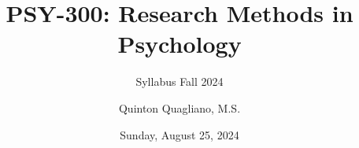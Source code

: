 \documentclass[
  12pt,
  letterpaper,
]{scrartcl}
\title{PSY-300: Research Methods in Psychology}
\subtitle{Syllabus Fall 2024}
\author{Quinton Quagliano, M.S.}
\date{Sunday, August 25, 2024}
\begin{document}


\begin{titlepage}


\newcommand{\titlepagepagealign}{
\ifthenelse{\equal{center}{right}}{\raggedleft}{}
\ifthenelse{\equal{center}{center}}{\centering}{}
\ifthenelse{\equal{center}{left}}{\raggedright}{}
}


\newcommand{\titleandsubtitle}{
{{\huge{\bfseries{\nohyphens{PSY-300: Research Methods in
Psychology}}}}\par
}%

\vspace{\betweentitlesubtitle}
{
{\Large{\nohyphens{Syllabus Fall 2024}}}\par
}}
\newcommand{\titlepagetitleblock}{
\newcommand{\HRule}{\rule{\linewidth}{0.5mm}} 

\HRule\\[0.4cm]

\titleandsubtitle

\HRule\\
}
\newcommand{\authorstyle}[1]{{\small{#1}}}

\newcommand{\affiliationstyle}[1]{{\small{#1}}}

\newcommand{\titlepageauthorblock}{
\newlength{\miniA}
\setlength{\miniA}{0pt}
\newlength{\namelen}
\settowidth{\namelen}{Quinton Quagliano,
M.S.}\setlength{\miniA}{\maxof{\miniA}{\namelen}}
\setlength{\miniA}{\miniA+0.05\textwidth}
\newlength{\miniB}
\setlength{\miniB}{0.99\textwidth - \miniA}
\begin{minipage}{\miniA}
\begin{flushleft}
{\authorstyle{Quinton Quagliano, M.S.}}
\end{flushleft}
\end{minipage}
\begin{minipage}{\miniB}
\begin{flushright}
{\affiliationstyle{Department of Psychology
\\}}
\end{flushright}
\end{minipage}}

\newcommand{\titlepageaffiliationblock}{}
\newcommand{\headerstyled}{%
{\textsc{\LARGE{}}}
}
\newcommand{\footerstyled}{%
{}
}
\newcommand{\datestyled}{%
{\large{Sunday, August 25, 2024}}
}


\newcommand{\titlepageheaderblock}{\headerstyled}


\end{titlepage}
\end{document}
